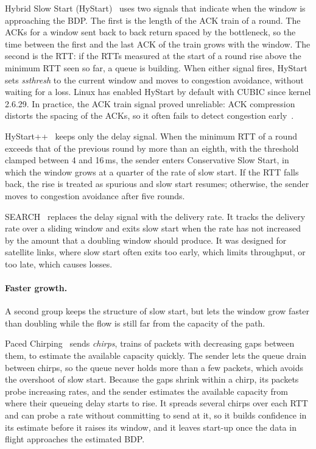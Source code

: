 Hybrid Slow Start (HyStart)~\cite{ha2008hystart,ha2011taming} uses two signals that indicate when the window is
approaching the BDP. The first is the length of the
ACK train of a round. The ACKs for a window sent back to back return spaced by
the bottleneck, so the time between the first and the last ACK of the train grows
with the window. The second is the RTT: if the RTTs measured at the start of a round
rise above the minimum RTT seen so far, a queue is building. When either signal fires,
HyStart sets \textit{ssthresh} to the current window and moves to congestion
avoidance, without waiting for a loss. Linux has enabled HyStart by default with CUBIC
since kernel 2.6.29. In practice, the ACK train signal proved unreliable: ACK compression distorts the spacing of the ACKs, so it often fails to detect congestion early~\cite{rfc9406}.

HyStart++~\cite{rfc9406} keeps only the delay
signal. When the minimum RTT of a round exceeds that of the previous
round by more than an eighth, with the threshold clamped between 4 and 16\,ms, the
sender enters Conservative Slow Start, in which the window grows at a quarter of the
rate of slow start. If the RTT falls back, the rise is treated as spurious and slow
start resumes; otherwise, the sender moves to congestion avoidance after five rounds.

SEARCH~\cite{kachooei2023search} replaces the delay signal with the delivery rate. It
tracks the delivery rate over a sliding window and exits slow start when the rate has
not increased by the amount that a doubling window should produce. It was designed for
satellite links, where slow start often exits too early, which limits throughput, or
too late, which causes losses. 

\paragraph{Faster growth.} A second group keeps the structure of slow start, but lets
the window grow faster than doubling while the flow is still far from the capacity of
the path.

Paced Chirping~\cite{misund2019paced} sends \emph{chirps}, trains of packets
with decreasing gaps between them, to estimate the available capacity
quickly. The sender lets the queue drain between chirps, so the
queue never holds more than a few packets, which avoids the overshoot of slow start.
Because the gaps shrink within a chirp, its packets probe increasing rates, and the
sender estimates the available capacity from where their queueing delay starts to
rise. It spreads several chirps over each RTT and can probe a
rate without committing to send at it, so it builds confidence in its estimate before
it raises its window, and it leaves start-up once the data in flight approaches the
estimated BDP.

